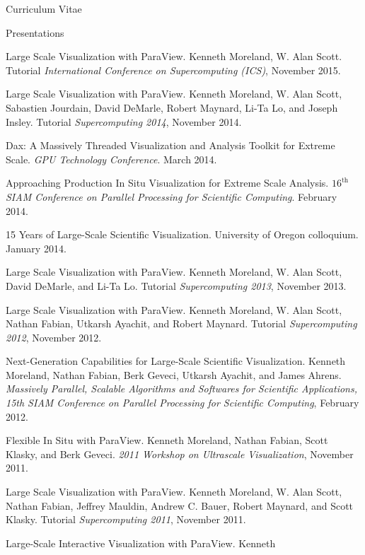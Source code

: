 \documentclass{article}
\begin{document}
\begin{cv}{Curriculum Vitae}
    \begin{cvlist}{Presentations}
    \item[Large Scale Visualization with ParaView.] Kenneth Moreland, W.
      Alan Scott. Tutorial \emph{International Conference on Supercomputing
        (ICS)}, November 2015.
    \item[Large Scale Visualization with ParaView.] Kenneth Moreland, W.
      Alan Scott, Sabastien Jourdain, David DeMarle, Robert Maynard, Li-Ta
      Lo, and Joseph Insley. Tutorial \emph{Supercomputing 2014}, November
      2014.
    \item[Dax: A Massively Threaded Visualization and Analysis Toolkit for
      Extreme] Scale. \emph{GPU Technology Conference}. March 2014.
    \item[Approaching Production In Situ Visualization for Extreme Scale
      Analysis.] \emph{$16^{\mathrm{th}}$ SIAM Conference on Parallel
      Processing for Scientific Computing}. February 2014.
    \item[15 Years of Large-Scale Scientific Visualization.] University of
      Oregon colloquium. January 2014.
    \item[Large Scale Visualization with ParaView.] Kenneth Moreland, W.
      Alan Scott, David DeMarle, and Li-Ta Lo. Tutorial
      \emph{Supercomputing 2013}, November 2013.
    \item[Large Scale Visualization with ParaView.] Kenneth Moreland,
      W. Alan Scott, Nathan Fabian, Utkarsh Ayachit, and Robert
      Maynard. Tutorial \emph{Supercomputing 2012}, November 2012.
    \item[Next-Generation Capabilities for Large-Scale Scientific
      Visualization.] Kenneth Moreland, Nathan Fabian, Berk Geveci, Utkarsh
      Ayachit, and James Ahrens. \emph{Massively Parallel, Scalable
        Algorithms and Softwares for Scientific Applications, 15th SIAM
        Conference on Parallel Processing for Scientific Computing},
      February 2012.
    \item[Flexible In Situ with ParaView.] Kenneth Moreland, Nathan Fabian,
      Scott Klasky, and Berk Geveci. \emph{2011 Workshop on Ultrascale
        Visualization}, November 2011.
    \item[Large Scale Visualization with ParaView.] Kenneth Moreland,
      W. Alan Scott, Nathan Fabian, Jeffrey Mauldin, Andrew C. Bauer,
      Robert Maynard, and Scott Klasky. Tutorial \emph{Supercomputing
        2011}, November 2011.
    \item[Large-Scale Interactive Visualization with ParaView.] Kenneth

\end{cvlist}
\end{cv}
\end{document}
